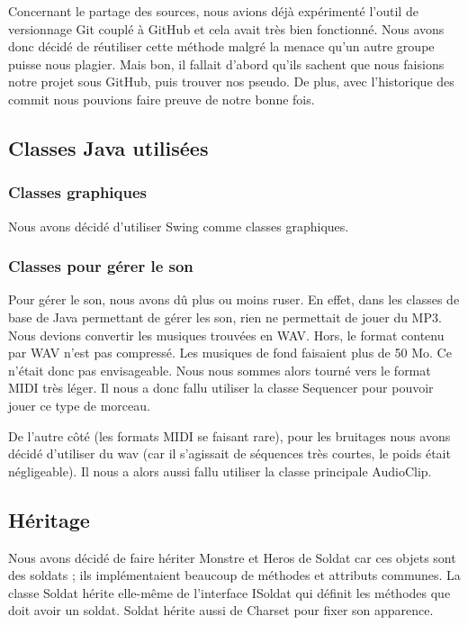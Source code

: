 \documentclass{article}
\begin{document}
  Concernant le partage des sources, nous avions déjà expérimenté l'outil de versionnage Git couplé à GitHub et cela avait très bien fonctionné.
  Nous avons donc décidé de réutiliser cette méthode malgré la menace qu'un autre groupe puisse nous plagier. Mais bon, il fallait d'abord qu'ils sachent que nous faisions notre projet sous GitHub, puis trouver nos pseudo.
  De plus, avec l'historique des commit nous pouvions faire preuve de notre bonne fois.


\subsection{Classes Java utilisées}
  \subsubsection{Classes graphiques} Nous avons décidé d'utiliser Swing comme classes graphiques. %
  
  \subsubsection{Classes pour gérer le son}
  Pour gérer le son, nous avons dû plus ou moins ruser.
  En effet, dans les classes de base de Java permettant de gérer les son, rien ne permettait de jouer du MP3.
  Nous devions convertir les musiques trouvées en WAV. Hors, le format contenu par WAV n'est pas compressé.
  Les musiques de fond faisaient plus de 50 Mo. Ce n'était donc pas envisageable.
  Nous nous sommes alors tourné vers le format MIDI très léger.
  Il nous a donc fallu utiliser la classe Sequencer pour pouvoir jouer ce type de morceau.
  
  De l'autre côté (les formats MIDI se faisant rare), pour les bruitages nous avons décidé d'utiliser du wav (car il s'agissait de séquences très courtes, le poids était négligeable).
  Il nous a alors aussi fallu utiliser la classe principale AudioClip.

  \subsection{Héritage}
  Nous avons décidé de faire hériter Monstre et Heros de Soldat car ces objets sont des soldats ; ils implémentaient beaucoup de méthodes et attributs communes.
  La classe Soldat hérite elle-même de l'interface ISoldat qui définit les méthodes que doit avoir un soldat. Soldat hérite aussi de Charset pour fixer son apparence.
  
\end{document}

